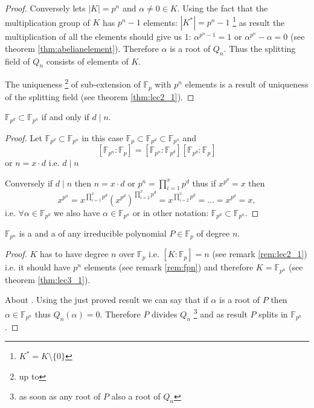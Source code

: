 \begin{theorem}
\begin{proof}
    Conversely lets $\left|K\right| = p^n$ and
    $\alpha \ne 0 \in K$.
    Using the fact that the multiplication group of $K$ has $p^n - 1$
    elements: $\left|K^*\right| = p^n - 1$
    \footnote{
      $K^* = K \setminus \{0\}$
    }
    as result the multiplication of all the elements should give us
    $1$: $\alpha^{p^n-1} = 1$ or $\alpha^{p^n} - \alpha = 0$
    (see theorem \ref{thm:abelianelement}).
    Therefore $\alpha$ is a root of $Q_n$. Thus the splitting field of
    $Q_n$ consists of elements of $K$.

    The uniqueness
    \footnote{
      up to 
    }
    of sub-extension of
    $\mathbb{F}_p$ with $p^n$ elements is a result of uniqueness of
    the splitting field (see theorem \ref{thm:lec2_1}). 
  \end{proof}
  \label{thm:lec3_1}
\end{theorem}

\begin{theorem}
  $\mathbb{F}_{p^d} \subset \mathbb{F}_{p^n}$ if and only if $d \mid n$. 
  \begin{proof}
    Let $\mathbb{F}_{p^d} \subset \mathbb{F}_{p^n}$ in this case
    $\mathbb{F}_p \subset \mathbb{F}_{p^d} \subset \mathbb{F}_{p^n}$
    and
    \[
    \left[\mathbb{F}_{p^n}:\mathbb{F}_{p}\right] =
    \left[\mathbb{F}_{p^n}:\mathbb{F}_{p^d}\right]
    \left[\mathbb{F}_{p^d}:\mathbb{F}_{p}\right]
    \]
    or $n = x \cdot d$ i.e. $d \mid n$

    Conversely if $d \mid n$ then $n = x \cdot d$ or
    $p^n = \prod^x_{i=1} p^d$ thus if $x^{p^d} = x$ then
    \[
    x^{p^n} = x^{\prod^x_{i=1} p^d}
    \left(x^{p^d}\right)^{\prod^x_{i=2} p^d} = x^{\prod^x_{i=2} p^d} =
    \dots = x^{p^d} = x,
    \]
    i.e. $\forall \alpha \in \mathbb{F}_{p^d}$ we also have
    $\alpha \in \mathbb{F}_{p^n}$ or in other notation:
    $\mathbb{F}_{p^d} \subset \mathbb{F}_{p^n}$.
  \end{proof}
  \label{thm:lec3_1_2}
\end{theorem}

\begin{theorem}
  $\mathbb{F}_{p^n}$ is a  and a
   of any irreducible polynomial
  $P \in \mathbb{F}_p$ of degree $n$.
  \begin{proof}
     $K$ has to have degree $n$ over
    $\mathbb{F}_p$ i.e.
    $\left[K:\mathbb{F}_p\right] = n$ (see remark \ref{rem:lec2_1})
    i.e. it should have $p^n$
    elements (see remark \ref{rem:fpn})
    and therefore $K=\mathbb{F}_{p^n}$
    (see theorem \ref{thm:lec3_1}).

    About . Using the just proved result
    we can say that if $\alpha$ is a root of $P$
    then $\alpha \in \mathbb{F}_{p^n}$ thus
    $Q_n\left(\alpha\right) = 0$. Therefore $P$ divides $Q_n$ 
    \footnote{as soon as any root of $P$ also a root of $Q_n$} and as
    result $P$ splits in $\mathbb{F}_{p^n}$.
  \end{proof}
  \label{thm:lec3_1_3}
\end{theorem}

